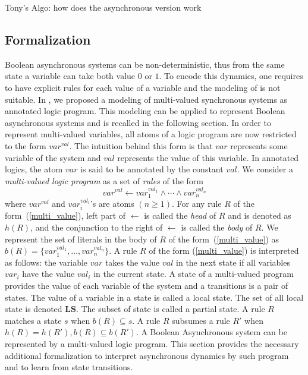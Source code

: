 Tony's Algo: how does the asynchronous version work

\subsection{Formalization}
    
	Boolean asynchronous systems can be non-deterministic, thus from the same state a variable can take both value $0$ or $1$.
	To encode this dynamics, one requires to have explicit rules for each value of a variable and the modeling of \cite{ribeiro2015learning} is not suitable.
	In \cite{DMTRICLP15}, we proposed a modeling of multi-valued synchronous systems as annotated logic program.
    This modeling can be applied to represent Boolean asynchronous systems and is recalled in the following section.
	In order to represent multi-valued variables, all atoms of a logic program are now restricted to the form $var^{val}$.
	The intuition behind this form is that $var$ represents some variable of the system and $val$ represents the value of this variable.
	In annotated logics, the atom $var$ is said to be annotated by the constant $val$.
	We consider a {\it multi-valued logic program\/} as a set of {\it rules\/} of the form  
	\begin{equation}\label{multi_value}
		var^{val} \leftarrow var_1^{val_1} \wedge \cdots \wedge var_n^{val_n}
	\end{equation}
	where $var^{val}$ and $var_i^{val_i}$'s are atoms $(n \geq 1)$.
	For any rule $R$ of the form~(\ref{multi_value}), left part of $\leftarrow$ is called the {\it head\/} of $R$ and is denoted as $h(R)$,
	and the conjunction to the right of $\leftarrow$ is called the {\it body\/} of $R$.  
	We represent the set of literals in the body of $R$ of the form~(\ref{multi_value}) as $b(R)=\{var_1^{val_1},\ldots,var_n^{val_n}\}$. 
	A rule $R$ of the form (\ref{multi_value}) is interpreted as follows:
	the variable $var$ takes the value $val$ in the next state if all variables $var_i$ have the value $val_i$ in the current state.
	A state of a multi-valued program provides the value of each variable of the system and a transitions is a pair of states.
	The value of a variable in a state is called a local state.
	The set of all local state is denoted $\mathbf{LS}$.
	The subset of state is called a partial state.
	A rule $R$ matches a state $s$ when $b(R) \subseteq s$.
	A rule $R$ subsumes a rule $R'$ when $h(R)=h(R'), b(R) \subseteq b(R')$.
%
A Boolean Asynchronous system can be represented by a multi-valued logic program.
This section provides the necessary additional formalization to interpret asynchronous dynamics by such program and to learn from state transitions.

